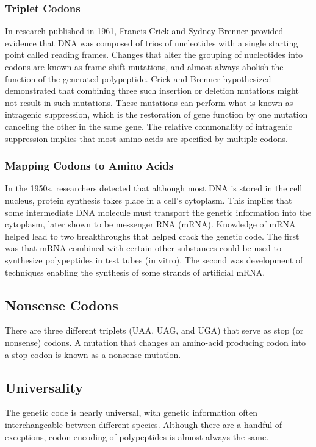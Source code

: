 \documentclass[12pt,titlepage]{article}
\begin{document}
      \subsubsection{Triplet Codons}
        In research published in 1961, Francis Crick and Sydney Brenner provided evidence that DNA was composed of trios of nucleotides with a single starting point
        called reading frames. Changes that alter the grouping of nucleotides into codons are known as frame-shift mutations, and almost always abolish the function
        of the generated polypeptide. Crick and Brenner hypothesized demonstrated that combining three such insertion or deletion mutations might not result in such
        mutations. These mutations can perform what is known as intragenic suppression, which is the restoration of gene function by one mutation canceling the other
        in the same gene. The relative commonality of intragenic suppression implies that most amino acids are specified by multiple codons.

      \subsubsection{Mapping Codons to Amino Acids}
        In the 1950s, researchers detected that although most DNA is stored in the cell nucleus, protein synthesis takes place in a cell's cytoplasm. This implies that
        some intermediate DNA molecule must transport the genetic information into the cytoplasm, later shown to be messenger RNA (mRNA). Knowledge of mRNA helped lead
        to two breakthroughs that helped crack the genetic code. The first was that mRNA combined with certain other substances could be used to synthesize polypeptides
        in test tubes (in vitro). The second was development of techniques enabling the synthesis of some strands of artificial mRNA.

    \subsection{Nonsense Codons}
      There are three different triplets (UAA, UAG, and UGA) that serve as stop (or nonsense) codons. A mutation that changes an amino-acid producing codon into a stop
      codon is known as a nonsense mutation.

    \subsection{Universality}
      The genetic code is nearly universal, with genetic information often interchangeable between different species. Although there are a handful of exceptions, codon
      encoding of polypeptides is almost always the same.
\end{document}
